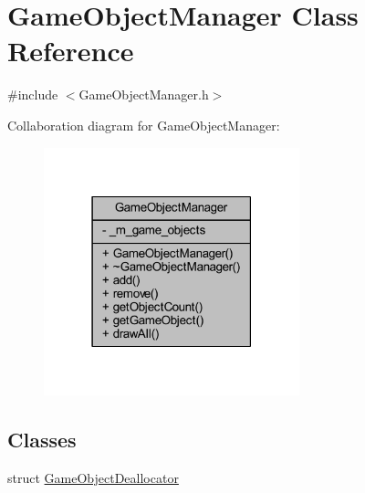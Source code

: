 \hypertarget{class_game_object_manager}{\section{Game\+Object\+Manager Class Reference}
\label{class_game_object_manager}
}


{\ttfamily \#include $<$Game\+Object\+Manager.\+h$>$}



Collaboration diagram for Game\+Object\+Manager\+:\nopagebreak
\begin{figure}[H]
\begin{center}
\leavevmode
\includegraphics[width=210pt]{class_game_object_manager__coll__graph}
\end{center}
\end{figure}
\subsection*{Classes}
\begin{DoxyCompactItemize}
\item 
struct \hyperlink{struct_game_object_manager_1_1_game_object_deallocator}{Game\+Object\+Deallocator}
\end{DoxyCompactItemize}
